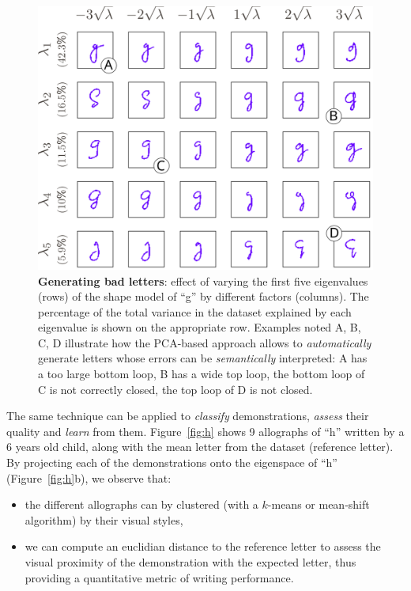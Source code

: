 \documentclass{article}
\begin{document}
\begin{figure}
    \centering
    \includegraphics[width=0.9\linewidth]{cowriter-g}
    \caption{\small \label{fig:sampleLetters} \textbf{Generating bad letters}:
        effect of varying the first five eigenvalues (rows) of the shape model
        of ``g'' by different factors (columns). The percentage of the total
        variance in the dataset explained by each eigenvalue is shown      on
        the appropriate row. Examples noted A, B, C, D illustrate how the
        PCA-based approach allows to \emph{automatically} generate letters whose
        errors can be \emph{semantically} interpreted: A has a too large bottom
        loop, B has a wide top loop, the bottom loop of C is not correctly
        closed, the top loop of D is not closed.}

\end{figure}

The same technique can be applied to \emph{classify} demonstrations,
\emph{assess} their quality and
\emph{learn} from them. Figure~\ref{fig:h} shows 9 allographs of ``h'' written by a 6
years old child, along with the mean letter from the
dataset (reference letter). By projecting each of the demonstrations onto the eigenspace
of ``h'' (Figure~\ref{fig:h}b), we observe that:

\begin{itemize}
    \item the different allographs can by clustered (with a $k$-means or
        mean-shift algorithm) by their visual styles,
    \item we can compute an euclidian distance to the reference letter to assess
        the visual proximity of the demonstration with the expected letter, thus
        providing a quantitative metric of writing performance.
\end{itemize}
\end{document}

